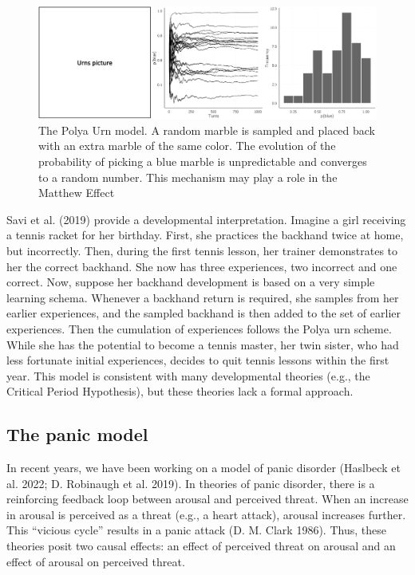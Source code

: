 \documentclass[
  a4paper,
  DIV=11,
  numbers=noendperiod,
  oneside]{scrreprt}
\begin{document}
\begin{figure}

{\centering \includegraphics{media/ch4n/fig-ch4n-img12-old-60.png}

}

\caption{\label{fig-ch4n-img12-old-60}The Polya Urn model. A random
marble is sampled and placed back with an extra marble of the same
color. The evolution of the probability of picking a blue marble is
unpredictable and converges to a random number. This mechanism may play
a role in the Matthew Effect}

\end{figure}

Savi et al. (2019) provide a developmental interpretation. Imagine a
girl receiving a tennis racket for her birthday. First, she practices
the backhand twice at home, but incorrectly. Then, during the first
tennis lesson, her trainer demonstrates to her the correct backhand. She
now has three experiences, two incorrect and one correct. Now, suppose
her backhand development is based on a very simple learning schema.
Whenever a backhand return is required, she samples from her earlier
experiences, and the sampled backhand is then added to the set of
earlier experiences. Then the cumulation of experiences follows the
Polya urn scheme. While she has the potential to become a tennis master,
her twin sister, who had less fortunate initial experiences, decides to
quit tennis lessons within the first year. This model is consistent with
many developmental theories (e.g., the Critical Period Hypothesis), but
these theories lack a formal approach.

\hypertarget{sec-The-panic-model}{%
\subsection{The panic model}\label{sec-The-panic-model}}

In recent years, we have been working on a model of panic disorder
(Haslbeck et al. 2022; D. Robinaugh et al. 2019). In theories of panic
disorder, there is a reinforcing feedback loop between arousal and
perceived threat. When an increase in arousal is perceived as a threat
(e.g., a heart attack), arousal increases further. This ``vicious
cycle'' results in a panic attack (D. M. Clark 1986). Thus, these
theories posit two causal effects: an effect of perceived threat on
arousal and an effect of arousal on perceived threat.
\end{document}
